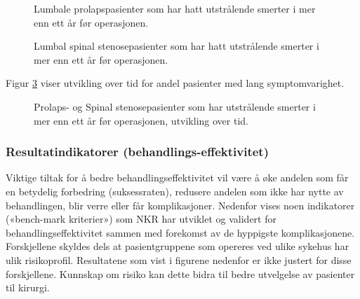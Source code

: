 \documentclass [norsk,a4paper,twoside]{article}\usepackage[]{graphicx}\usepackage[]{color}
\begin{document}
\begin{figure}[h] 
\caption{Lumbale prolapspasienter som har hatt utstrålende smerter i mer enn ett år før operasjonen.}
\label{fig:VarighSmerteUtstrAvdPro}
\end{figure}

\begin{figure}[h] 
\caption{Lumbal spinal stenosepasienter som har hatt utstrålende smerter i mer enn ett år før operasjonen.}
\label{fig:VarighSmerteUtstrAvdSS}
\end{figure}

Figur \ref{fig:VarighSmerteUtstrTid} viser utvikling over tid for andel pasienter med lang symptomvarighet. 

\begin{figure}[h] 
\caption{Prolaps- og Spinal stenosepasienter som har utstrålende smerter i mer enn ett år før operasjonen, utvikling over tid.}
\label{fig:VarighSmerteUtstrTid}
\end{figure}





\clearpage


\subsubsection{Resultatindikatorer (behandlings-effektivitet)}

Viktige tiltak for å bedre behandlingseffektivitet vil være å øke andelen som får en
betydelig forbedring (suksessraten), redusere andelen som ikke har nytte av
behandlingen, blir verre eller får komplikasjoner. Nedenfor vises noen indikatorer
(«bench-mark kriterier») som NKR har utviklet og validert for
behandlingseffektivitet sammen med forekomst av de hyppigste komplikasjonene.
Forskjellene skyldes dels at pasientgruppene som opereres ved ulike sykehus har
ulik risikoprofil. Resultatene som vist i figurene nedenfor er ikke justert for disse
forskjellene. Kunnskap om risiko kan dette bidra til bedre utvelgelse av pasienter til
kirurgi.
\end{document}
